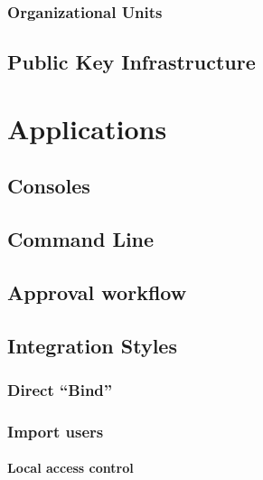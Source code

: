 \hypertarget{organizational-units}{%
\subsubsection{Organizational Units}\label{organizational-units}}

\hypertarget{public-key-infrastructure}{%
\subsection{Public Key
Infrastructure}\label{public-key-infrastructure}}

\hypertarget{applications}{%
\section{Applications}\label{applications}}

\hypertarget{consoles}{%
\subsection{Consoles}\label{consoles}}

\hypertarget{command-line}{%
\subsection{Command Line}\label{command-line}}

\hypertarget{approval-workflow}{%
\subsection{Approval workflow}\label{approval-workflow}}

\hypertarget{integration-styles}{%
\subsection{Integration Styles}\label{integration-styles}}

\hypertarget{direct-bind}{%
\subsubsection{Direct ``Bind''}\label{direct-bind}}

\hypertarget{import-users}{%
\subsubsection{Import users}\label{import-users}}

\hypertarget{local-access-control}{%
\paragraph{Local access control}\label{local-access-control}}

